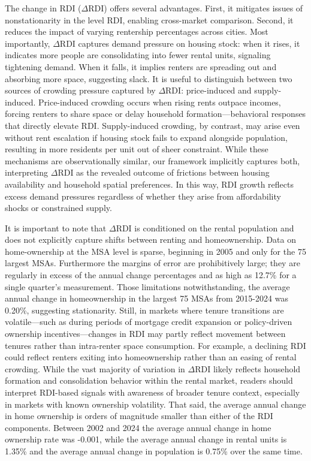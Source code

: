 \documentclass[APA,Times1COL]{WileyNJDv5} %
\begin{document}
The change in RDI (\( \Delta \text{RDI} \)) offers several advantages. First, it mitigates issues of nonstationarity in the level RDI, enabling cross-market comparison. Second, it reduces the impact of varying rentership percentages across cities. Most importantly, \( \Delta \text{RDI} \) captures demand pressure on housing stock: when it rises, it indicates more people are consolidating into fewer rental units, signaling tightening demand. When it falls, it implies renters are spreading out and absorbing more space, suggesting slack. It is useful to distinguish between two sources of crowding pressure captured by $\Delta \text{RDI}$: price-induced and supply-induced. Price-induced crowding occurs when rising rents outpace incomes, forcing renters to share space or delay household formation---behavioral responses that directly elevate RDI. Supply-induced crowding, by contrast, may arise even without rent escalation if housing stock fails to expand alongside population, resulting in more residents per unit out of sheer constraint. While these mechanisms are observationally similar, our framework implicitly captures both, interpreting $\Delta \text{RDI}$ as the revealed outcome of frictions between housing availability and household spatial preferences. In this way, RDI growth reflects excess demand pressures regardless of whether they arise from affordability shocks or constrained supply.


It is important to note that \(\Delta \text{RDI}\) is conditioned on the rental population and does not explicitly capture shifts between renting and homeownership. Data on home-ownership at the MSA level is sparse, beginning in 2005 and only for the 75 largest MSAs. Furthermore the margins of error are prohibitively large; they are regularly in excess of the annual change percentages and as high as 12.7\% for a single quarter's measurement. Those limitations notwithstanding, the average annual change in homeownership in the largest 75 MSAs from 2015-2024 was 0.20\%, suggesting stationarity. Still, in markets where tenure transitions are volatile---such as during periods of mortgage credit expansion or policy-driven ownership incentives---changes in RDI may partly reflect movement between tenures rather than intra-renter space consumption. For example, a declining RDI could reflect renters exiting into homeownership rather than an easing of rental crowding. While the vast majority of variation in \(\Delta \text{RDI}\) likely reflects household formation and consolidation behavior within the rental market, readers should interpret RDI-based signals with awareness of broader tenure context, especially in markets with known ownership volatility. That said, the average annual change in home ownership is orders of magnitude smaller than either of the RDI components. Between 2002 and 2024 the average annual change in home ownership rate was -0.001, while the average annual change in rental units is 1.35\% and the average annual change in population is 0.75\% over the same time.
\end{document}
